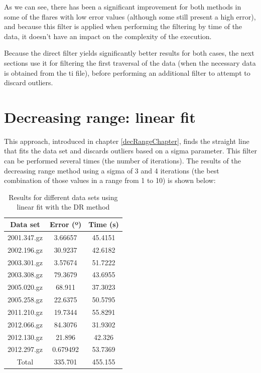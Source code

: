 As we can see, there has been a significant improvement for both methods in some of the flares with low error values (although some still present a high error), and because this filter is applied when performing the filtering by time of the data, it doesn't have an impact on the complexity of the execution. 

Because the direct filter yields significantly better results for both cases, the next sections use it for filtering the first traversal of the data (when the necessary data is obtained from the ti file), before performing an additional filter to attempt to discard outliers.

\clearpage

\section{Decreasing range: linear fit}

This approach, introduced in chapter \ref{decRangeChapter}, finds the straight line that fits the data set and discards outliers based on a sigma parameter. This filter can be performed several times (the number of iterations). The results of the decreasing range method using a sigma of 3 and 4 iterations (the best combination of those values in a range from 1 to 10) is shown below:

\begin{table}[h!]
	\centering
	\def\arraystretch{1.2}
	\begin{tabular}{|c c c|} 
		\hline
		Data set & Error (º) & Time (s) \\ [0.5ex] 
		\hline\hline
		2001.347.gz & 3.66657 & 45.4151 \\
		\hline
		2002.196.gz & 30.9237 & 42.6182 \\
		\hline
		2003.301.gz & 3.57674 & 51.7222 \\
		\hline
		2003.308.gz & 79.3679 & 43.6955 \\
		\hline
		2005.020.gz & 68.911 & 37.3023 \\
		\hline
		2005.258.gz & 22.6375 & 50.5795 \\
		\hline
		2011.210.gz & 19.7344 & 55.8291 \\
		\hline
		2012.066.gz & 84.3076 & 31.9302 \\
		\hline
		2012.130.gz & 21.896 & 42.326 \\
		\hline
		2012.297.gz & 0.679492 & 53.7369 \\
		\hline
		Total & 335.701 & 455.155 \\
		\hline
	\end{tabular}
	\caption{Results for different data sets using linear fit with the DR method}
\end{table}

